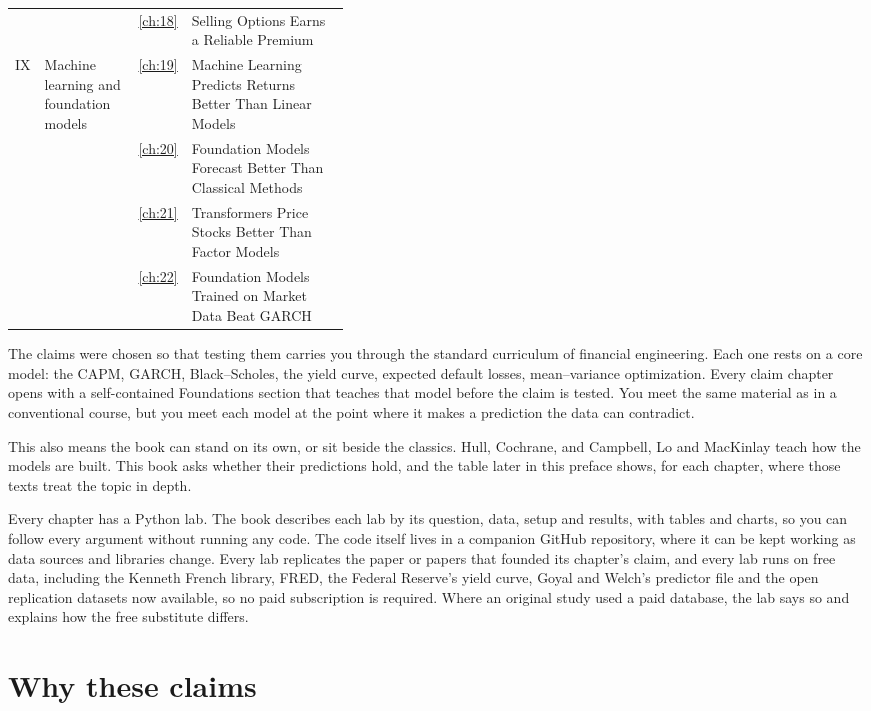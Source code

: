 \begin{table}[htbp]
\begin{tabularx}{0.95\linewidth}{@{}>{\raggedright\arraybackslash}p{0.07\linewidth}>{\raggedright\arraybackslash}p{0.28\linewidth}>{\raggedleft\arraybackslash}p{0.04\linewidth}>{\raggedright\arraybackslash}X@{}}
 &  & \ref{ch:18} & Selling Options Earns a Reliable Premium \\
\addlinespace
IX & Machine learning and foundation models & \ref{ch:19} & Machine Learning Predicts Returns Better Than Linear Models \\
 &  & \ref{ch:20} & Foundation Models Forecast Better Than Classical Methods \\
 &  & \ref{ch:21} & Transformers Price Stocks Better Than Factor Models \\
 &  & \ref{ch:22} & Foundation Models Trained on Market Data Beat GARCH \\
\bottomrule
\end{tabularx}
\end{table}


The claims were chosen so that testing them carries you through the standard curriculum of financial engineering. Each one rests on a core model: the CAPM, GARCH, Black--Scholes, the yield curve, expected default losses, mean--variance optimization. Every claim chapter opens with a self-contained Foundations section that teaches that model before the claim is tested. You meet the same material as in a conventional course, but you meet each model at the point where it makes a prediction the data can contradict.

This also means the book can stand on its own, or sit beside the classics. Hull, Cochrane, and Campbell, Lo and MacKinlay teach how the models are built. This book asks whether their predictions hold, and the table later in this preface shows, for each chapter, where those texts treat the topic in depth.

Every chapter has a Python lab. The book describes each lab by its question, data, setup and results, with tables and charts, so you can follow every argument without running any code. The code itself lives in a companion GitHub repository, where it can be kept working as data sources and libraries change. Every lab replicates the paper or papers that founded its chapter's claim, and every lab runs on free data, including the Kenneth French library, FRED, the Federal Reserve's yield curve, Goyal and Welch's predictor file and the open replication datasets now available, so no paid subscription is required. Where an original study used a paid database, the lab says so and explains how the free substitute differs.

\section*{Why these claims}

